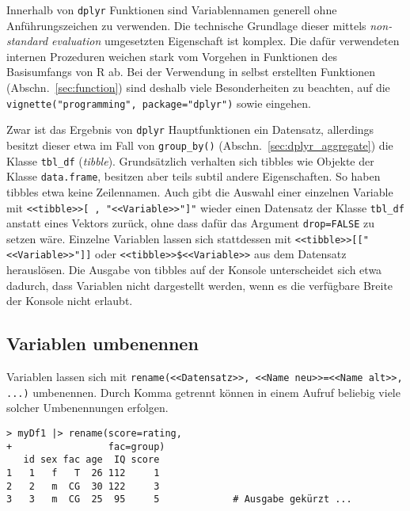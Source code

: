 Innerhalb von \lstinline!dplyr! Funktionen sind Variablennamen generell ohne Anführungszeichen zu verwenden. Die technische Grundlage dieser mittels \emph{non-standard evaluation} umgesetzten Eigenschaft ist komplex. Die dafür verwendeten internen Prozeduren weichen stark vom Vorgehen in Funktionen des Basisumfangs von R ab. Bei der Verwendung in selbst erstellten Funktionen (Abschn.\ \ref{sec:function}) sind deshalb viele Besonderheiten zu beachten, auf die \lstinline!vignette("programming", package="dplyr")! sowie  eingehen.

Zwar ist das Ergebnis von \lstinline!dplyr! Hauptfunktionen ein Datensatz, allerdings besitzt dieser etwa im Fall von \lstinline!group_by()! (Abschn.\ \ref{sec:dplyr_aggregate}) die Klasse \lstinline!tbl_df! (\emph{tibble}). Grundsätzlich verhalten sich tibbles wie Objekte der Klasse \lstinline!data.frame!, besitzen aber teils subtil andere Eigenschaften. So haben tibbles etwa keine Zeilennamen. Auch gibt die Auswahl einer einzelnen Variable mit \lstinline!<<tibble>>[ , "<<Variable>>"]"! wieder einen Datensatz der Klasse \lstinline!tbl_df! anstatt eines Vektors zurück, ohne dass dafür das Argument \lstinline!drop=FALSE! zu setzen wäre. Einzelne Variablen lassen sich stattdessen mit \lstinline!<<tibble>>[["<<Variable>>"]]! oder \lstinline!<<tibble>>$<<Variable>>! aus dem Datensatz herauslösen. Die Ausgabe von tibbles auf der Konsole unterscheidet sich etwa dadurch, dass Variablen nicht dargestellt werden, wenn es die verfügbare Breite der Konsole nicht erlaubt.

\subsection{Variablen umbenennen}
\label{sec:dplyr_rename}

Variablen lassen sich mit \lstinline!rename(<<Datensatz>>, <<Name neu>>=<<Name alt>>, ...)! umbenennen. Durch Komma getrennt können in einem Aufruf beliebig viele solcher Umbenennungen erfolgen.
\begin{lstlisting}
> myDf1 |> rename(score=rating,
+                 fac=group)
   id sex fac age  IQ score
1   1   f   T  26 112     1
2   2   m  CG  30 122     3
3   3   m  CG  25  95     5             # Ausgabe gekürzt ...
\end{lstlisting}

